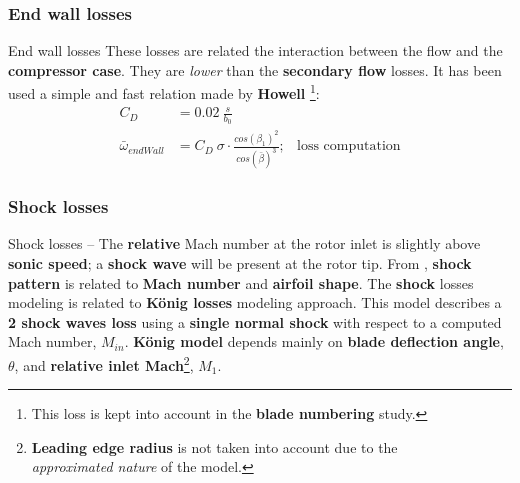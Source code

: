 \subsubsection{End wall losses}
	\begin{frame}{End wall losses}
		These losses are related the interaction between the flow and the \textbf{compressor case}. They are \textit{lower} than the \textbf{secondary flow} losses.
		\newline
		It has been used a simple and fast relation made by \textbf{Howell} \cite[Ch. 6]{axial2004}\footnote{This loss is kept into account in the \textbf{blade numbering} study.}:
		\begin{align}
			C_{D} & = 0.02 \ \frac{s}{b_{0}} \nonumber \\ 
			\bar{\omega}_{endWall} & = C_{D} \ \sigma \cdot \frac{cos( \beta_1 )^2}{cos( \bar{\beta} )^3}; & \text{loss computation} \nonumber 
		\end{align}		
	\end{frame}

\subsubsection{Shock losses}
	\begin{frame}{Shock losses -- }
		The \textbf{relative} Mach number at the rotor inlet is slightly above \textbf{sonic speed}; a \textbf{shock wave} will be present at the rotor tip. From \cite{manfredi2020transonic}, \textbf{shock pattern} is related to \textbf{Mach number} and \textbf{airfoil shape}.
		\newline
		\newline 
		The \textbf{shock} losses modeling is related to \textbf{K\"onig losses} modeling approach. This model describes a \textbf{2 shock waves loss} using a \textbf{single normal shock} with respect to a computed Mach number, $M_{in}$. 
		\newline
		\newline
		\textbf{K\"onig model} depends mainly on \textbf{blade deflection angle}, $\theta$, and \textbf{relative inlet Mach}\footnote{\textbf{Leading edge radius} is not taken into account due to the \\ \textit{approximated nature} of the model.}, $M_1$.
	\end{frame}
	
